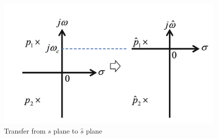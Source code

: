 \documentclass[book]{jlreq}
\begin{document}
\begin{figure}[hbt]
    \begin{center}
      \includegraphics[width=12cm,clip]{figs/Fig3.5.png}
      \caption{Transfer from $s$ plane to $\hat{s}$ plane}
     \label{Fig3.5}
    \end{center}
\end{figure}
\end{document}
